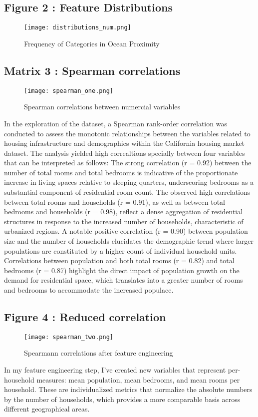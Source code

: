 \documentclass[12pt]{article}
\begin{document}
\subsection{Figure 2 : Feature Distributions}
\begin{figure}[H]
	\centering
	\texttt{[image: distributions\_num.png]}
	\caption{Frequency of Categories in Ocean Proximity}
	\label{fig:distributions}
\end{figure}


\subsection{Matrix 3 : Spearman correlations}
\begin{figure}[H]
	\centering
	\texttt{[image: spearman\_one.png]}
	\caption{Spearman correlations between numercial variables}
	\label{fig:corr_one}
\end{figure}
In the exploration of the dataset, a Spearman rank-order correlation was conducted to assess the monotonic relationships between the variables related to housing infrastructure and demographics within the California housing market dataset. The analysis yielded high correaltions specially between four variables that can be interpreted as follows: The strong correlation (r = 0.92) between the number of total rooms and total bedrooms is indicative of the proportionate increase in living spaces relative to sleeping quarters, underscoring bedrooms as a substantial component of residential room count. The observed high correlations between total rooms and households (r = 0.91), as well as between total bedrooms and households (r = 0.98), reflect a dense aggregation of residential structures in response to the increased number of households, characteristic of urbanized regions. A notable positive correlation (r = 0.90) between population size and the number of households elucidates the demographic trend where larger populations are constituted by a higher count of individual household units. Correlations between population and both total rooms (r = 0.82) and total bedrooms (r = 0.87) highlight the direct impact of population growth on the demand for residential space, which translates into a greater number of rooms and bedrooms to accommodate the increased populace.




\subsection{Figure 4 : Reduced correlation}
\begin{figure}[H]
	\centering
	\texttt{[image: spearman\_two.png]}
	\caption{Spearmann correlations after feature engineering}
	\label{fig:corr_two}
\end{figure}
In my feature engineering step, I've created new variables that represent per-household measures: mean population, mean bedrooms, and mean rooms per household. These are individualized metrics that normalize the absolute numbers by the number of households, which provides a more comparable basis across different geographical areas.
\end{document}
